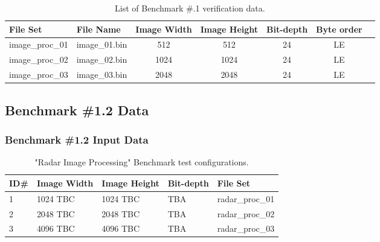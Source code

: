\begin{table}[!h]
    \begin{tabular}{|l|l|c|c|c|c|c|}
        \hline
        File Set                & File Name         & Image Width   & Image Height  & Bit-depth     & Byte order    \\ \hline
        \hline
        image\_proc\_01	        & image\_01.bin     & 512           & 512           & 24            & LE            \\ \hline
        \hline
        image\_proc\_02	        & image\_02.bin     & 1024          & 1024          & 24            & LE            \\ \hline
        \hline
        image\_proc\_03	        & image\_03.bin     & 2048          & 2048          & 24            & LE            \\ \hline
    \end{tabular}
    \caption{List of Benchmark \#.1 verification data.}
    \label{tab:bm1_1_verif_data}
\end{table}

\newpage
\subsection{Benchmark \#1.2 Data}

\subsubsection{Benchmark \#1.2 Input Data}

\begin{table}[!h]
    \begin{tabular}{|l|l|l|l|l|}
        \hline
        ID\#        & Image Width   & Image Height  & Bit-depth     & File Set    \\
        \hline
        1	        & 1024 TBC      & 1024 TBC      & TBA           & radar\_proc\_01 \\
        \hline
        2	        & 2048 TBC      & 2048 TBC      & TBA           & radar\_proc\_02 \\
        \hline
        3	        & 4096 TBC      & 4096 TBC      & TBA           & radar\_proc\_03 \\
        \hline
    \end{tabular}
    \caption{"Radar Image Processing" Benchmark test configurations.}
    \label{tab:bm1_2_file_sets}
\end{table}

